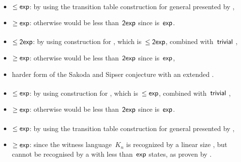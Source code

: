 \paragraph{\OMOLA{}\tto\ONFA}\label{cost:OM1LAto1NFA}
\begin{itemize}
	\item $\le\mathsf{exp}$: by using the transition table construction for general \OLAs presented by ,
	\item $\ge\mathsf{exp}$: otherwise \hyperref[cost:OM1LAto1DFA]{\OMOLA{}\tto\ODFA} would be less than~$\mathsf{2exp}$ since\linebreak\hyperref[cost:1NFAto1DFA]{\ONFA{}\tto\ODFA} is~$\mathsf{exp}$.
\end{itemize}
\paragraph{\OMOLA{}\tto\TDFA}
\begin{itemize}
	\item $\le\mathsf{2exp}$: by using construction for \hyperref[cost:OM1LAto1DFA]{\OMOLA{}\tto\ODFA}, which is~$\le\mathsf{2exp}$, combined with~$\mathsf{trivial}$ \ODFA{}\tto\TDFA,
	\item $\ge\mathsf{exp}$: otherwise \hyperref[cost:OM1LAto1DFA]{\OMOLA{}\tto\ODFA} would be less than~$\mathsf{2exp}$ since\linebreak\hyperref[cost:2DFAto1DFA]{\TDFA{}\tto\ODFA} is~$\mathsf{exp}$,
	\item harder form of the Sakoda and Sipser conjecture with an extended \TNFA.
\end{itemize}
\paragraph{\OMOLA{}\tto\TNFA}
\begin{itemize}
	\item $\le\mathsf{exp}$: by using construction for \hyperref[cost:OM1LAto1NFA]{\OMOLA{}\tto\ONFA}, which is~$\le\mathsf{exp}$, combined with~$\mathsf{trivial}$ \ONFA{}\tto\TNFA,
	\item $\ge\mathsf{exp}$: otherwise \hyperref[cost:OM1LAto1DFA]{\OMOLA{}\tto\ODFA} would be less than~$\mathsf{2exp}$ since\linebreak\hyperref[cost:2NFAto1DFA]{\TNFA{}\tto\ODFA} is~$\mathsf{exp}$.
\end{itemize}
\paragraph{\OMODLA{}\tto\ODFA}\label{cost:OM1DLAto1DFA}
\begin{itemize}
	\item $\le\mathsf{exp}$: by using the transition table construction for general \ODLAs presented by ,
	\item $\ge\mathsf{exp}$: since the witness language~$K_n$ is recognized by a linear size \OMODLA, but cannot be recognised by a \TNFA with less than~$\mathsf{exp}$ states, as proven by .
\end{itemize}
